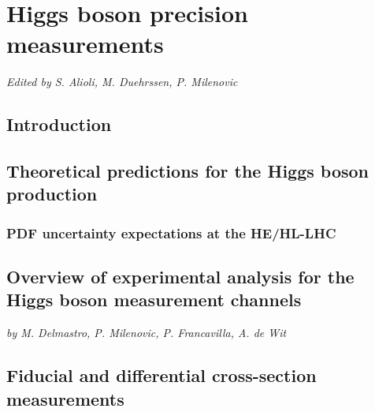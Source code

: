 \documentclass[../report.tex]{subfiles}
\providecommand{\main}{..}
\begin{document}
\section{Higgs boson precision measurements\label{sec2}}
\begin{center}{\it Edited by S. Alioli, M. Duehrssen, P. Milenovic} \end{center}
\subsection{Introduction}
\label{sec:2:introduction}


\subsection{Theoretical predictions for the Higgs boson production}
\label{sec:2_HXSWG1}


\subsubsection{PDF uncertainty expectations at the HE/HL-LHC}
\label{sec:2:PDFuncertainties}


\subsection{Overview of experimental analysis for the Higgs boson measurement channels}
\label{sec:2:expan}
\begin{center} {\it by M. Delmastro, P. Milenovic, P. Francavilla, A. de Wit} \end{center}
\label{sec:2:channels}


\subsection{Fiducial and differential cross-section measurements}
\label{sec:2:fiducial}


\end{document}
